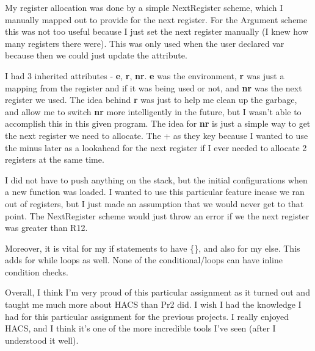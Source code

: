 \documentclass[11pt, oneside]{article}
\begin{document}
\par My register allocation was done by a simple NextRegister scheme, which I manually mapped out to provide for the next register. For the Argument scheme this was not too useful because I just set the next register manually (I knew how many registers there were). This was only used when the user declared var because then we could just update the attribute. 

\par I had 3 inherited attributes - \textbf{e}, \textbf{r}, \textbf{nr}. \textbf{e} was the environment, \textbf{r} was just a mapping from the register and if it was being used or not, and \textbf{nr} was the next register we used. The idea behind \textbf{r} was just to help me clean up the garbage, and allow me to switch \textbf{nr} more intelligently in the future, but I wasn't able to accomplish this in this given program. The idea for \textbf{nr} is just a simple way to get the next register we need to allocate. The + as they key because I wanted to use the minus later as a lookahead for the next register if I ever needed to allocate 2 registers at the same time. 

\par I did not have to push anything on the stack, but the initial configurations when a new function was loaded. I wanted to use this particular feature incase we ran out of registers, but I just made an assumption that we would never get to that point. The NextRegister scheme would just throw an error if we the next register was greater than R12. 

\par Moreover, it is vital for my if statements to have \{\}, and also for my else. This adds for while loops as well. None of the conditional/loops can have inline condition checks.

\par Overall, I think I'm very proud of this particular assignment as it turned out and taught me much more about HACS than Pr2 did. I wish I had the knowledge I had for this particular assignment for the previous projects. I really enjoyed HACS, and I think it's one of the more incredible tools I've seen (after I understood it well).
\end{document}
